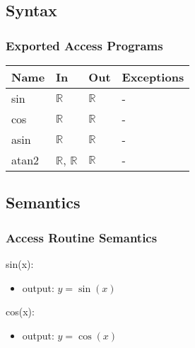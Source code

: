 \documentclass[12pt, titlepage]{article}
\begin{document}
\subsection{Syntax}



\subsubsection{Exported Access Programs}

\begin{center}
\begin{tabular}{p{2cm} p{4cm} p{4cm} p{2cm}}
\hline
\textbf{Name} & \textbf{In} & \textbf{Out} & \textbf{Exceptions} \\
\hline
sin & $\mathbb{R}$ & $\mathbb{R}$ & - \\
cos & $\mathbb{R}$ & $\mathbb{R}$ & - \\
asin & $\mathbb{R}$ & $\mathbb{R}$ & - \\
atan2 & $\mathbb{R}$, $\mathbb{R}$ & $\mathbb{R}$ & - \\
\hline
\end{tabular}
\end{center}

\subsection{Semantics}

\subsubsection{Access Routine Semantics}

\noindent sin(x):
\begin{itemize}
\item output: $y = \sin(x)$
\end{itemize}

\noindent cos(x):
\begin{itemize}
\item output: $y = \cos(x)$
\end{itemize}
\end{document}

